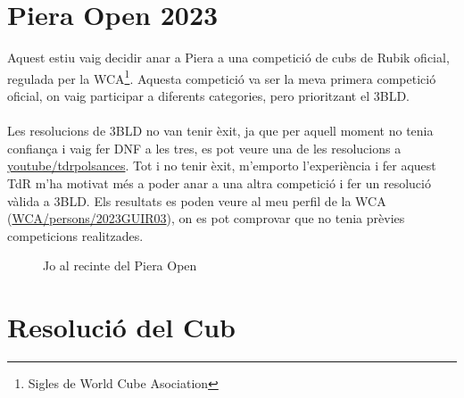 \chapter{Piera Open 2023}

Aquest estiu vaig decidir anar a Piera a una competició de cubs de Rubik oficial, regulada per la WCA\footnote{Sigles de World Cube Asociation}. Aquesta competició va ser la meva primera competició oficial, on vaig participar a diferents categories, pero prioritzant el 3BLD.
\\\\Les resolucions de 3BLD no van tenir èxit, ja que per aquell moment no tenia confiança i vaig fer DNF a les tres, es pot veure una de les resolucions a \href{https://www.youtube.com/@TDRPolSances}{youtube/tdrpolsances}.
Tot i no tenir èxit, m'emporto l'experiència i fer aquest TdR m'ha motivat més a poder anar a una altra competició i fer un resolució vàlida a 3BLD. Els resultats es poden veure al meu perfil de la WCA (\href{https://www.worldcubeassociation.org/persons/2023GUIR03?event=333bf}{WCA/persons/2023GUIR03}), on es pot comprovar que no tenia prèvies competicions realitzades.

\begin{figure}[!ht]
    \centering
    \caption{Jo al recinte del Piera Open}
    \label{fig:piera}
\end{figure}


\chapter{Resolució del Cub}

